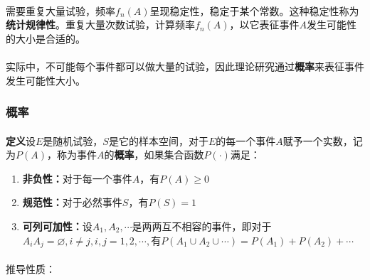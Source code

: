 \paragraph{}
需要重复大量试验，频率$f_n(A)$呈现稳定性，稳定于某个常数。这种稳定性称为\textbf{统计规律性}。重复大量次数试验，计算频率$f_n(A)$，以它表征事件$A$发生可能性的大小是合适的。

\paragraph{}
实际中，不可能每个事件都可以做大量的试验，因此理论研究通过\textbf{概率}来表征事件发生可能性大小。

\subsubsection{概率}
\paragraph{}
\textbf{定义\;}设$E$是随机试验，$S$是它的样本空间，对于$E$的每一个事件$A$赋予一个实数，记为$P(A)$，称为事件$A$的\textbf{概率}，如果集合函数$P(\cdot)$满足：
\begin{enumerate}
  \item \textbf{非负性：}对于每一个事件$A$，有$P(A) \geq 0$
  \item \textbf{规范性：}对于必然事件$S$，有$P(S)=1$
  \item \textbf{可列可加性：}设$A_1, A_2, \cdots$是两两互不相容的事件，即对于$A_iA_j=\varnothing, i \neq j, i, j=1,2,\cdots,$有$ P(A_1 \cup A_2 \cup \cdots)=P(A_1)+P(A_2)+\cdots$
\end{enumerate}

\paragraph{}
推导性质：

